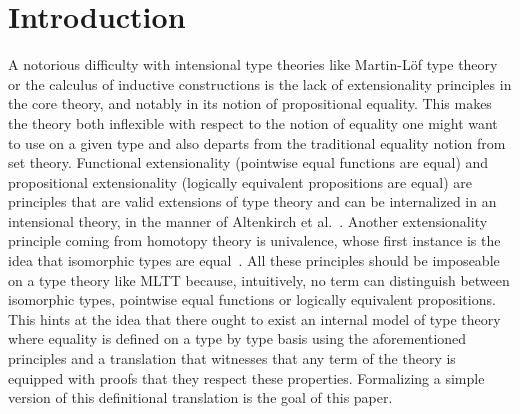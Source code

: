 \section{Introduction}
\label{sec:introduction}
A notorious difficulty with intensional type theories like Martin-Löf
type theory or the calculus of inductive constructions is the lack of
extensionality principles in the core theory, and notably in its
notion of propositional equality. This makes the theory both
inflexible with respect to the notion of equality one might want to
use on a given type and also departs from the traditional equality
notion from set theory. Functional extensionality (pointwise equal
functions are equal) and propositional extensionality (logically
equivalent propositions are equal) are principles that are valid
extensions of type theory and can be internalized in an intensional
theory, in the manner of Altenkirch et
al.~\cite{altenkirch-mcbride-wierstra:ott-now}.  Another
extensionality principle coming from homotopy theory is univalence,
whose first instance is the idea that isomorphic types are
equal~\cite{Voevodsky:2011yq,Pelayo:2012uq}. All these principles
should be imposeable on a type theory like MLTT because, intuitively,
no term can distinguish between isomorphic types, pointwise equal
functions or logically equivalent propositions.
%
This hints at the idea that there ought to exist an internal model of
type theory where equality is defined on a type by type basis using
the aforementioned principles and a translation that witnesses that
any term of the theory is equipped with proofs that they respect these
properties. Formalizing a simple version of this definitional
translation is the goal of this paper.


